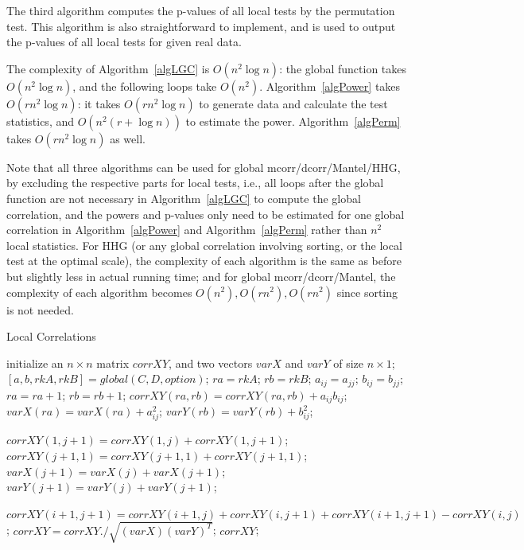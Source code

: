 \documentclass[11pt]{article}
\begin{document}
The third algorithm computes the p-values of all local tests by the permutation test. This algorithm is also straightforward to implement, and is used to output the p-values of all local tests for given real data.

The complexity of Algorithm~\ref{algLGC} is $O(n^2 \log n)$: the global function takes $O(n^2 \log n)$, and the following loops take $O(n^2)$. Algorithm~\ref{algPower} takes $O(rn^2 \log n)$: it takes $O(rn^2 \log n)$ to generate data and calculate the test statistics, and $O(n^2 (r+\log n))$ to estimate the power. Algorithm~\ref{algPerm} takes $O(rn^2 \log n)$ as well. 

Note that all three algorithms can be used for global mcorr/dcorr/Mantel/HHG, by excluding the respective parts for local tests, i.e., all loops after the global function are not necessary in Algorithm~\ref{algLGC} to compute the global correlation, and the powers and p-values only need to be estimated for one global correlation in Algorithm~\ref{algPower} and Algorithm~\ref{algPerm} rather than $n^2$ local statistics. For HHG (or any global correlation involving sorting, or the local test at the optimal scale), the complexity of each algorithm is the same as before but slightly less in actual running time; and for global mcorr/dcorr/Mantel, the complexity of each algorithm becomes $O(n^2), O(rn^2), O(rn^2)$ since sorting is not needed.

\begin{algorithm}
\caption{Local Correlations}
\label{algLGC}
\begin{algorithmic}
\State initialize an $n \times n$ matrix $corrXY$, and two vectors $varX$ and $varY$ of size $n \times 1$;
\State $[a,b,rkA,rkB]=global(C,D,option)$; 
\State $ra=rkA$; $rb=rkB$;
\State $a_{ij}=a_{jj}$; 
\EndIf
{}
\State $b_{ij}=b_{jj}$;
\EndIf
\State $ra=ra+1$; $rb=rb+1$;
\State $corrXY(ra, rb)=corrXY(ra, rb)+a_{ij}b_{ij}$;
\State $varX(ra)=varX(ra)+a_{ij}^2$;
\State $varY(rb)=varY(rb)+b_{ij}^2$;
\EndFor
\EndFor

\State $corrXY(1, j+1)=corrXY(1, j)+corrXY(1, j+1)$;
\State $corrXY(j+1,1)=corrXY(j+1,1)+corrXY(j+1,1)$;
\State $varX(j+1)=varX(j)+varX(j+1)$;
\State $varY(j+1)=varY(j)+varY(j+1)$;
\EndFor

\State $corrXY(i+1,j+1)=corrXY(i+1,j)+corrXY(i,j+1)+corrXY(i+1,j+1)-corrXY(i,j)$;
\EndFor
\EndFor
\State $corrXY=corrXY./\sqrt{(varX) (varY)^{T}}$; 
\State \Return $corrXY$;
\EndFunction
\end{algorithmic}
\end{algorithm}
\end{document}
